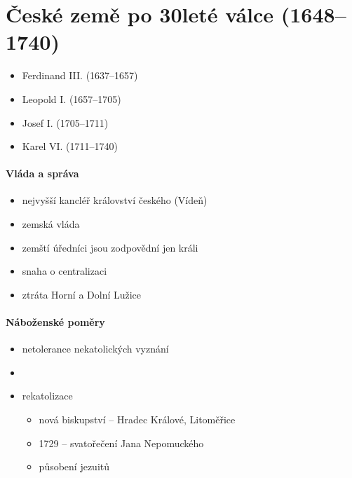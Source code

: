 \section{České země po 30leté válce (1648--1740)}
\begin{itemize}
\item Ferdinand III. (1637--1657)
\item Leopold I. (1657--1705)
\item Josef I. (1705--1711)
\item Karel VI. (1711--1740)
\end{itemize}

\paragraph{Vláda a správa}
\begin{itemize}
\item nejvyšší kancléř království českého (Vídeň)
\item zemská vláda
\item zemští úředníci jsou zodpovědní jen králi
\item snaha o centralizaci
\item ztráta Horní a Dolní Lužice
\end{itemize}

\paragraph{Náboženské poměry}
\begin{itemize}
\item netolerance nekatolických vyznání
\item {}
\item rekatolizace
	\begin{itemize}
	\item nová biskupství -- Hradec Králové, Litoměřice
	\item 1729 -- svatořečení Jana Nepomuckého
	\item působení jezuitů
	\end{itemize}
\end{itemize}

